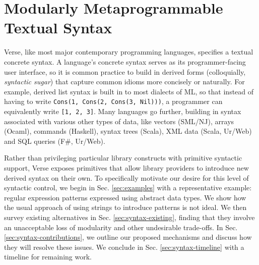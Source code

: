 \section{Modularly Metaprogrammable Textual Syntax}\label{sec:syntax}
Verse, like most major contemporary programming languages, specifies a textual concrete syntax. %
A language's concrete syntax serves as its programmer-facing user interface, so it is common practice to build in  derived forms (colloquially, \emph{syntactic sugar}) that capture common idioms more concisely or naturally. %
For example, derived list syntax is built in to most dialects of ML, so that instead of having to write \lstinline{Cons(1, Cons(2, Cons(3, Nil)))}, a programmer can equivalently write \lstinline{[1, 2, 3]}. Many languages go further, building in syntax associated with various other types of data, like vectors (SML/NJ), arrays (Ocaml), commands (Haskell), syntax trees (Scala), XML data (Scala, Ur/Web) and SQL queries (F\#, Ur/Web). %

Rather than privileging  particular library constructs with primitive syntactic support, Verse exposes primitives that allow library providers to introduce new derived syntax on their own. %
To specifically motivate our desire for this level of syntactic control, we begin in Sec. \ref{sec:examples} with a representative example: regular expression patterns expressed using abstract data types. We show how the usual approach of using strings to introduce patterns is not ideal. We then survey existing alternatives in Sec. \ref{sec:syntax-existing}, finding that they involve an unacceptable loss of modularity and other undesirable trade-offs. In Sec. \ref{sec:syntax-contributions}, we outline our proposed mechanisms and discuss how they will resolve these issues. We conclude in Sec. \ref{sec:syntax-timeline} with a timeline for remaining work.




